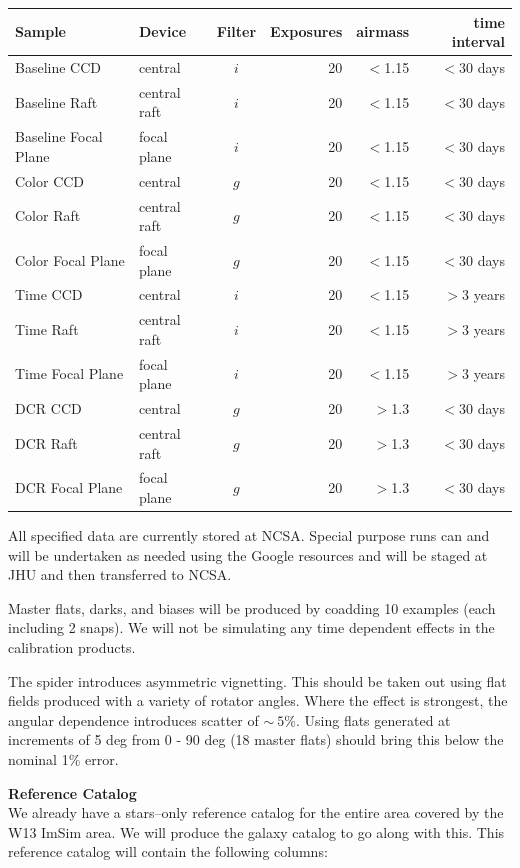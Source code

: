 \documentclass[12pt]{article}
\begin{document}
\begin{table}
\begin{tabular}{llcrrr}
Sample & Device & Filter & Exposures & airmass & time interval \\
\hline  
Baseline CCD             & central         & $i$  & 20 & $<$1.15 &$<$30 days \\
Baseline Raft              & central raft  & $i$  & 20 & $<$1.15 &$<$30 days \\
Baseline Focal Plane   & focal plane  &  $i$ & 20 & $<$1.15 &$<$30
days \\
\hline  
Color CCD             & central         & $g$  & 20 & $<$1.15 &$<$30 days \\
Color Raft              & central raft  & $g$  & 20 & $<$1.15 &$<$30 days \\
Color Focal Plane   & focal plane  &  $g$ & 20 & $<$1.15 &$<$30 days \\
\hline 
Time CCD             & central         & $i$  & 20 & $<$1.15 &$>$3 years \\
Time Raft              & central raft  & $i$  & 20 & $<$1.15 &$>$3 years \\
Time Focal Plane   & focal plane  &  $i$ & 20 & $<$1.15 &$>$3 years \\
\hline 
DCR CCD             & central         & $g$  & 20 & $>$1.3 &$<$30 days \\
DCR Raft              & central raft  & $g$  & 20 & $>$1.3 &$<$30 days \\
DCR Focal Plane   & focal plane  & $g$  & 20 & $>$1.3 &$<$30 days
\end{tabular}
\end{table}


All specified data are currently stored at NCSA.  Special purpose runs
can and will be undertaken as needed using the Google resources and
will be staged at JHU and then transferred to NCSA.  

Master flats, darks, and biases will be produced by coadding 10
examples (each including 2 snaps).  We will not be simulating any time
dependent effects in the calibration products.

The spider introduces asymmetric vignetting.  This should be taken out
using flat fields produced with a variety of rotator angles.  Where
the effect is strongest, the angular dependence introduces scatter of
$\sim~5$\%.  Using flats generated at increments of 5 deg from 0 - 90
deg (18 master flats) should bring this below the nominal 1\% error.  

{\bf Reference Catalog}\\
We already have a stars--only reference catalog for the entire area
covered by the W13 ImSim area.  We will produce the galaxy catalog to
go along with this.  This reference catalog will contain the following
columns:
\end{document}

